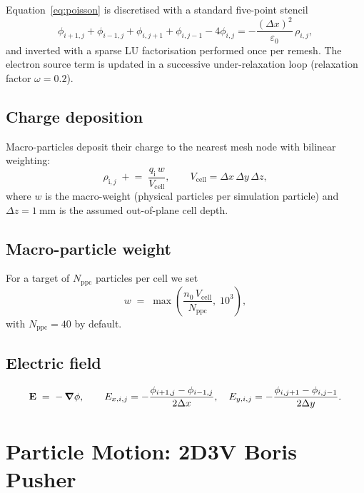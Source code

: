 \documentclass[11pt,a4paper]{article}
\begin{document}
Equation~\eqref{eq:poisson} is discretised with a standard
five-point stencil
\begin{equation}
    \phi_{i+1,j}+\phi_{i-1,j}+\phi_{i,j+1}+\phi_{i,j-1}-4\phi_{i,j}
    = -\frac{(\Delta x)^{2}}{\varepsilon_{0}}\,\rho_{i,j},
\end{equation}
and inverted with a sparse LU factorisation performed once per
remesh.  The electron source term is updated in a successive
under-relaxation loop (relaxation factor \(\omega = 0.2\)).

\subsection{Charge deposition}

Macro-particles deposit their charge to the nearest mesh node with
bilinear weighting:
\begin{equation}
    \rho_{\mathrm{i},j} \;+\!=\; \frac{q_{\mathrm{i}}\,w}{V_{\mathrm{cell}}},
    \qquad
    V_{\mathrm{cell}} = \Delta x\,\Delta y\,\Delta z,
\end{equation}
where \(w\) is the macro-weight (physical particles per simulation
particle) and \(\Delta z = \SI{1}{\milli\meter}\) is the assumed
out-of-plane cell depth.

\subsection{Macro-particle weight}

For a target of \(N_{\mathrm{ppc}}\) particles per cell we set
\begin{equation}
    w \;=\;
    \max\!\left(\frac{n_{0}\,V_{\mathrm{cell}}}{N_{\mathrm{ppc}}},\;10^{3}\right),
\end{equation}
with \(N_{\mathrm{ppc}} = 40\) by default.

\subsection{Electric field}

\begin{equation}
    \vb{E} \;=\; -\,\grad\phi,
    \qquad
    E_{x,i,j} = -\frac{\phi_{i+1,j}-\phi_{i-1,j}}{2\Delta x},\quad
    E_{y,i,j} = -\frac{\phi_{i,j+1}-\phi_{i,j-1}}{2\Delta y}.
\end{equation}

\section{Particle Motion: 2D3V Boris Pusher}
\end{document}
